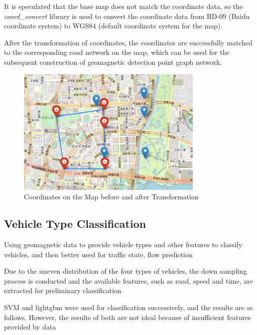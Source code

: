 \documentclass[fontset=none]{ctexart}
\theoremstyle{definition}
\theoremstyle{remark}
\begin{document}
It is speculated that the base map does not match the coordinate data, so the \textit{coord\_convert} library is used to convert the coordinate data from BD-09 (Baidu coordinate system) to WGS84 (default coordinate system for the map).

After the transformation of coordinates, the coordinates are successfully matched to the corresponding road network on the map, which can be used for the subsequent construction of geomagnetic detection point graph network.
\begin{figure}[htb]
  \centering
  \includegraphics[width=0.8\textwidth]{images/8-3-1.png}
  \caption{Coordinates on the Map before and after Transformation}
  \label{fig: 831}
\end{figure}

\clearpage
\subsection{Vehicle Type Classification}
Using geomagnetic data to provide vehicle types and other features to classify vehicles, and then better used for traffic state, flow prediction

Due to the uneven distribution of the four types of vehicles, the down sampling process is conducted and the available features, such as road, speed and time, are extracted for preliminary classification

SVM and lightgbm were used for classification successively, and the results are as follows. However, the results of both are not ideal because of insufficient features provided by data
\end{document}
